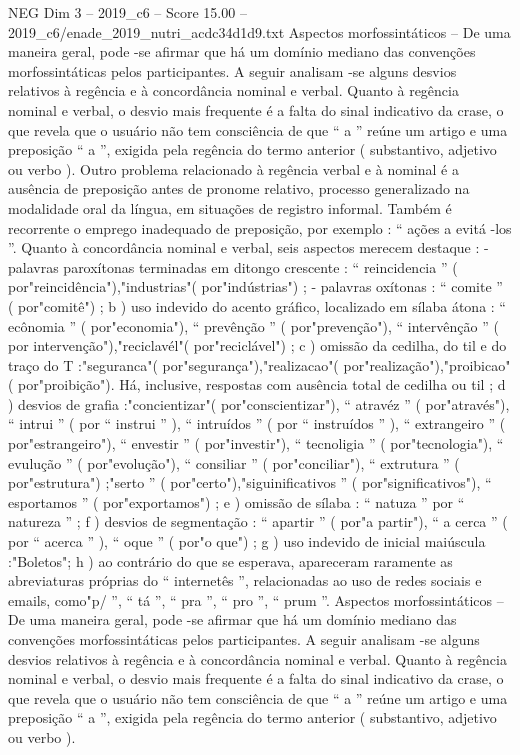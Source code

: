 \begin{textsample}{NEG Dim 3 – 2019\_c6 – Score 15.00 – 2019\_c6/enade\_2019\_nutri\_acdc34d1d9.txt}
Aspectos morfossintáticos – De uma maneira geral, pode -se afirmar que há um domínio mediano das convenções morfossintáticas pelos participantes.
A seguir analisam -se alguns desvios relativos à regência e à concordância nominal e verbal.
Quanto à regência nominal e verbal, o desvio mais frequente é a falta do sinal indicativo da crase, o que revela que o usuário não tem consciência de que “ a ” reúne um artigo e uma preposição “ a ”, exigida pela regência do termo anterior ( substantivo, adjetivo ou verbo ).
Outro problema relacionado à regência verbal e à nominal é a ausência de preposição antes de pronome relativo, processo generalizado na modalidade oral da língua, em situações de registro informal.
Também é recorrente o emprego inadequado de preposição, por exemplo : “ ações a evitá -los ”.
Quanto à concordância nominal e verbal, seis aspectos merecem destaque : - palavras paroxítonas terminadas em ditongo crescente : “ reincidencia ” ( por"reincidência"),"industrias"( por"indústrias") ; - palavras oxítonas : “ comite ” ( por"comitê") ; b ) uso indevido do acento gráfico, localizado em sílaba átona : “ ecônomia ” ( por"economia"), “ prevênção ” ( por"prevenção"), “ intervênção ” ( por intervenção"),"reciclavél"( por"reciclável") ; c ) omissão da cedilha, do til e do traço do T :"seguranca"( por"segurança"),"realizacao"( por"realização"),"proibicao"( por"proibição").
Há, inclusive, respostas com ausência total de cedilha ou til ; d ) desvios de grafia :"concientizar"( por"conscientizar"), “ atravéz ” ( por"através"), “ intrui ” ( por “ instrui ” ), “ intruídos ” ( por “ instruídos ” ), “ extrangeiro ” ( por"estrangeiro"), “ envestir ” ( por"investir"), “ tecnoligia ” ( por"tecnologia"), “ evulução ” ( por"evolução"), “ consiliar ” ( por"conciliar"), “ extrutura ” ( por"estrutura") ;"serto ” ( por"certo"),"siguinificativos ” ( por"significativos"), “ esportamos ” ( por"exportamos") ; e ) omissão de sílaba : “ natuza ” por “ natureza ” ; f ) desvios de segmentação : “ apartir ” ( por"a partir"), “ a cerca ” ( por “ acerca ” ), “ oque ” ( por"o que") ; g ) uso indevido de inicial maiúscula :"Boletos"; h ) ao contrário do que se esperava, apareceram raramente as abreviaturas próprias do “ internetês ”, relacionadas ao uso de redes sociais e emails, como"p/ ”, “ tá ”, “ pra ”, “ pro ”, “ prum ”.
Aspectos morfossintáticos – De uma maneira geral, pode -se afirmar que há um domínio mediano das convenções morfossintáticas pelos participantes.
A seguir analisam -se alguns desvios relativos à regência e à concordância nominal e verbal.
Quanto à regência nominal e verbal, o desvio mais frequente é a falta do sinal indicativo da crase, o que revela que o usuário não tem consciência de que “ a ” reúne um artigo e uma preposição “ a ”, exigida pela regência do termo anterior ( substantivo, adjetivo ou verbo ).

\end{textsample}
